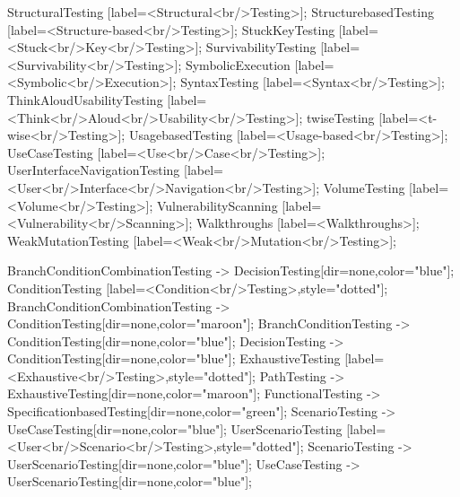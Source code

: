 \documentclass{article}
\begin{document}
{StructuralTesting [label=<Structural<br/>Testing>];
StructurebasedTesting [label=<Structure-based<br/>Testing>];
StuckKeyTesting [label=<Stuck<br/>Key<br/>Testing>];
SurvivabilityTesting [label=<Survivability<br/>Testing>];
SymbolicExecution [label=<Symbolic<br/>Execution>];
SyntaxTesting [label=<Syntax<br/>Testing>];
ThinkAloudUsabilityTesting [label=<Think<br/>Aloud<br/>Usability<br/>Testing>];
twiseTesting [label=<t-wise<br/>Testing>];
UsagebasedTesting [label=<Usage-based<br/>Testing>];
UseCaseTesting [label=<Use<br/>Case<br/>Testing>];
UserInterfaceNavigationTesting [label=<User<br/>Interface<br/>Navigation<br/>Testing>];
VolumeTesting [label=<Volume<br/>Testing>];
VulnerabilityScanning [label=<Vulnerability<br/>Scanning>];
Walkthroughs [label=<Walkthroughs>];
WeakMutationTesting [label=<Weak<br/>Mutation<br/>Testing>];

BranchConditionCombinationTesting -> DecisionTesting[dir=none,color="blue"];
ConditionTesting [label=<Condition<br/>Testing>,style="dotted"];
BranchConditionCombinationTesting -> ConditionTesting[dir=none,color="maroon"];
BranchConditionTesting -> ConditionTesting[dir=none,color="blue"];
DecisionTesting -> ConditionTesting[dir=none,color="blue"];
ExhaustiveTesting [label=<Exhaustive<br/>Testing>,style="dotted"];
PathTesting -> ExhaustiveTesting[dir=none,color="maroon"];
FunctionalTesting -> SpecificationbasedTesting[dir=none,color="green"];
ScenarioTesting -> UseCaseTesting[dir=none,color="blue"];
UserScenarioTesting [label=<User<br/>Scenario<br/>Testing>,style="dotted"];
ScenarioTesting -> UserScenarioTesting[dir=none,color="blue"];
UseCaseTesting -> UserScenarioTesting[dir=none,color="blue"];

}
\end{document}
